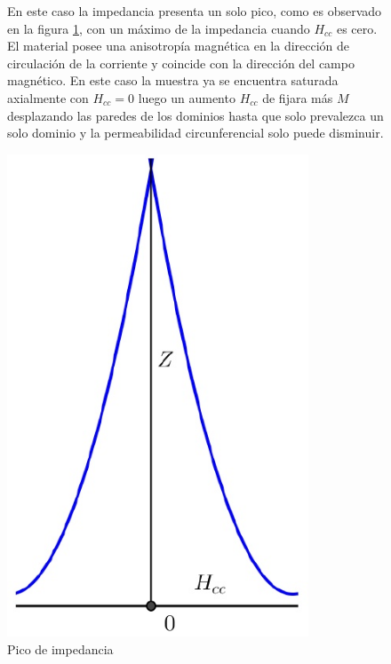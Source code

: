 \begin{figure}[H]
  \begin{minipage}[b]{0.47\textwidth}
En este caso la impedancia presenta un solo pico, como es observado en la figura \ref{fig:322}, con un máximo de la impedancia cuando $H_{cc}$ es cero. El material posee una anisotropía magnética en la dirección de circulación de la corriente y coincide con la dirección del campo magnético. En este caso la muestra ya se encuentra saturada axialmente con $H_{cc}=0$ luego un aumento $H_{cc}$ de fijara más $M$ desplazando las paredes de los dominios hasta que solo prevalezca un solo dominio y la permeabilidad circunferencial solo puede disminuir.
  \vspace{1.5cm}
  \end{minipage}
  \hfill
  \begin{minipage}[b]{0.47\textwidth}
  	 \centering
     \includegraphics[width=0.8\textwidth]{./Figures/fig322}
     \caption{Pico de impedancia}
	 \label{fig:322}
	 \vspace{0.0cm}
  \end{minipage}
\end{figure}

